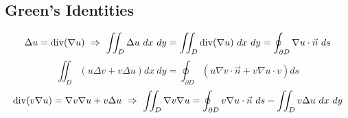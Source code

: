 \documentclass{article}
\begin{document}
\begin{twocolumn}
\subsection{Green's Identities}

	$$\Delta u =\divergence(\nabla u) \ \Rightarrow \ \iint_D \Delta u \ dx \ dy =\iint_D \divergence(\nabla u)\ dx \ dy = \oint_{\partial D} \nabla u \cdot \vec{n} \ ds $$
	$$\iint_D \left(u \Delta v + v \Delta u\right) dx \ dy = \oint_{\partial D} \left(u \nabla v \cdot \vec n + v \nabla u \cdot v \right) ds$$
	$$\divergence(v \nabla u) = \nabla v \nabla u + v \Delta u \ \Rightarrow \ \iint_D \nabla v \nabla u = \oint_{\partial D} v \nabla u \cdot \vec{n} \ ds - \iint_D v \Delta u \ dx \ dy$$
\end{twocolumn}
\end{document}
